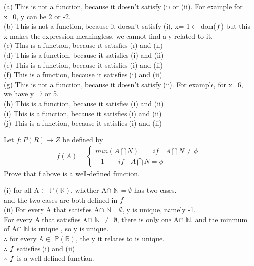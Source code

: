 \documentclass[11pt, a4paper, UTF8]{ctexart}
\begin{document}
\begin{solution}
(a) This is not a function, because it doesn't satisfy (i) or (ii). For example for x=0, y can be 2 or -2.\\
(b) This is not a function, because it doesn't satisfy (i), x=-1$\in$ dom($\mathnormal{f}$) but this x makes the expression meaningless, we cannot find a y related to it.\\
(c) This is a function, because it satisfies (i) and (ii)\\
(d) This is a function, because it satisfies (i) and (ii)\\
(e) This is a function, because it satisfies (i) and (ii)\\
(f) This is a function, because it satisfies (i) and (ii)\\
(g) This is not a function, because it doesn't satisfy (ii). For example, for x=6, we have y=7 or 5.\\
(h) This is a function, because it satisfies (i) and (ii)\\
(i) This is a function, because it satisfies (i) and (ii)\\
(j) This is a function, because it satisfies (i) and (ii)\\

\end{solution}

\begin{problem}[UD:13.4]
Let \(f:P(R) \rightarrow Z\) be defined by
\begin{align}
f(A) = 
\begin{cases}
min(A\bigcap N) \qquad if \quad A\bigcap N \neq \phi\\
-1              \qquad if \quad A\bigcap N = \phi
\end{cases}
\end{align}
Prove that f above is a well-defined function.
\end{problem}
\begin{solution}
(i) for all A$\in$ $\mathbb{P(R)}$, whether A$\cap$ $\mathbb{N}$ = $\emptyset$ has two cases.\\
and the two cases are both defined in $\mathnormal{f}$\\
(ii) For every A that satisfies A$\cap$ $\mathbb{N}$ =$\emptyset$, y is unique, namely -1.\\
For every A that satisfies A$\cap$ $\mathbb{N}$ $\not=$ $\emptyset$, there is only one A$\cap$ $\mathbb{N}$, and the minmum of A$\cap$ $\mathbb{N}$ is unique , so y is unique.\\
$\therefore$ for every A$\in$ $\mathbb{P(R)}$, the y it relates to is unique.\\
$\therefore$ $\mathnormal{f}$ satisfies (i) and (ii)\\
$\therefore$ $\mathnormal{f}$ is a well-defined function. 
\end{solution}
\end{document}
